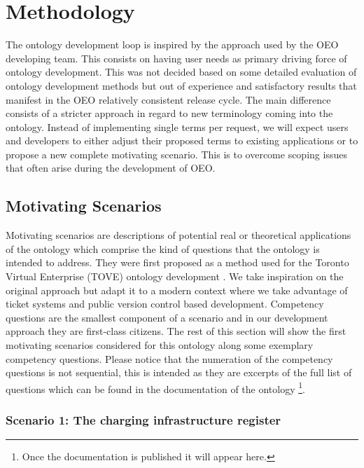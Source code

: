 ﻿\section{Methodology}
\label{methodology}

The ontology development loop is inspired by the approach used by the OEO
developing team. This consists on having user needs as primary driving force of
ontology development. This was not decided based on some detailed evaluation of
ontology development methods but out of experience and satisfactory results
that manifest in the OEO relatively consistent release cycle. The main
difference consists of a stricter approach in regard to new terminology coming
into the ontology. Instead of implementing single terms per request, we will
expect users and developers to either adjust their proposed terms to existing
applications or to propose a new complete motivating scenario. This is to
overcome scoping issues that often arise during the development of OEO. 


\subsection{Motivating Scenarios}

Motivating scenarios are descriptions of potential real or theoretical
applications of the ontology which comprise the kind of questions that the
ontology is intended to address.  They were first proposed as a method used for
the Toronto Virtual Enterprise (TOVE) ontology development
\cite{Gruninger.1995}. We take inspiration on the original approach but adapt
it to a modern context where we take advantage of ticket systems and public
version control based development. Competency questions are the smallest
component of a scenario and in our development approach they are first-class
citizens. The rest of this section will show the first motivating scenarios
considered for this ontology along some exemplary competency questions. Please
notice that the numeration of the competency questions is not sequential, this
is intended as they are excerpts of the full list of questions which can be
found in the documentation of the ontology \footnote{Once the documentation is
published it will appear here.}.

\subsubsection*{Scenario 1: The charging infrastructure register}

